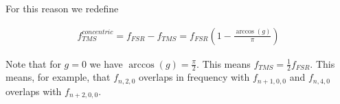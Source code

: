 \documentclass[12pt]{article}
\begin{document}
For this reason we redefine

\begin{align}
f_{TMS}^{concentric} = f_{FSR} - f_{TMS} = f_{FSR}\left(1-\frac{\arccos(g)}{\pi}\right)
\end{align}

Note that for $g=0$ we have $\arccos(g)=\frac{\pi}{2}$.
This means $f_{TMS}=\frac{1}{2} f_{FSR}$.
This means, for example, that $f_{n,2,0}$ overlaps in frequency with $f_{n+1,0,0}$ and $f_{n,4,0}$ overlaps with $f_{n+2,0,0}$.

\printbibliography
\end{document}
